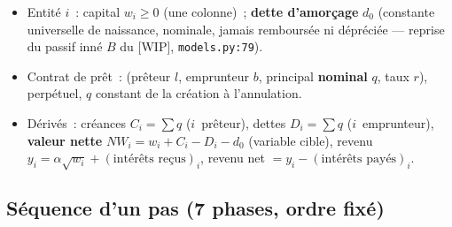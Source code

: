 \documentclass[11pt,a4paper]{article}
\newcommand{\NW}{\mathit{NW}}
\begin{document}
\begin{itemize}
  \item Entité $i$~: capital $w_i \geq 0$ (une colonne)~; \textbf{dette d'amorçage} $d_0$ (constante universelle de naissance, nominale, jamais remboursée ni dépréciée --- reprise du passif inné $B$ du [WIP], \texttt{models.py:79}).
  \item Contrat de prêt~: (prêteur $l$, emprunteur $b$, principal \textbf{nominal} $q$, taux $r$), perpétuel, $q$ constant de la création à l'annulation.
  \item Dérivés~: créances $C_i = \sum q$ ($i$~prêteur), dettes $D_i = \sum q$ ($i$~emprunteur), \textbf{valeur nette} $\NW_i = w_i + C_i - D_i - d_0$ (variable cible), revenu $y_i = \alpha\sqrt{w_i} + (\text{intérêts reçus})_i$, revenu net $= y_i - (\text{intérêts payés})_i$.
\end{itemize}

\subsection{Séquence d'un pas (7 phases, ordre fixé)}
\label{sec:sequence}
\end{document}
